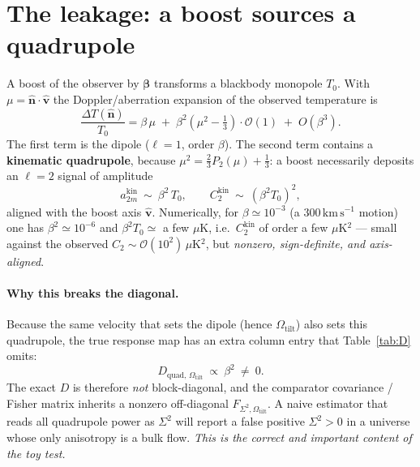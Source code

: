 \documentclass[11pt]{article}
\newcommand{\Sig}{\Sigma^2}
\newcommand{\Otilt}{\Omega_{\mathrm{tilt}}}
\newcommand{\nhat}{\hat{\mathbf n}}
\newcommand{\vhat}{\hat{\mathbf v}}
\begin{document}
\section{The leakage: a boost sources a quadrupole}
\label{sec:leak}

A boost of the observer by $\boldsymbol\beta$ transforms a blackbody monopole
$T_0$. With $\mu=\nhat\!\cdot\!\vhat$ the Doppler/aberration expansion of the
observed temperature is
\begin{equation}
  \frac{\Delta T(\nhat)}{T_0}
  = \beta\,\mu \;+\; \beta^2\!\left(\mu^2-\tfrac13\right)\cdot\mathcal{O}(1)
    \;+\; O(\beta^3).
  \label{eq:boost}
\end{equation}
The first term is the dipole ($\ell=1$, order $\beta$). The second term contains
a \textbf{kinematic quadrupole}, because $\mu^2=\tfrac23 P_2(\mu)+\tfrac13$: a
boost necessarily deposits an $\ell=2$ signal of amplitude
\begin{equation}
  a_{2m}^{\mathrm{kin}}\ \sim\ \beta^2\,T_0 ,
  \qquad
  C_2^{\mathrm{kin}}\ \sim\ (\beta^2 T_0)^2 ,
\end{equation}
aligned with the boost axis $\vhat$. Numerically, for $\beta\simeq10^{-3}$
(a $300\,\mathrm{km\,s^{-1}}$ motion) one has $\beta^2\simeq10^{-6}$ and
$\beta^2 T_0\simeq$ a few $\mu$K, i.e.\ $C_2^{\mathrm{kin}}$ of order a few
$\mu$K$^2$ --- small against the observed $C_2\sim\mathcal{O}(10^2)\,\mu$K$^2$,
but \emph{nonzero, sign-definite, and axis-aligned}.

\paragraph{Why this breaks the diagonal.} Because the same velocity that sets the
dipole (hence $\Otilt$) also sets this quadrupole, the true response map has an
extra column entry that Table~\ref{tab:D} omits:
\begin{equation}
  D_{\text{quad},\,\Otilt}\ \propto\ \beta^2\ \neq\ 0 .
  \label{eq:coupling}
\end{equation}
The exact $D$ is therefore \emph{not} block-diagonal, and the comparator
covariance / Fisher matrix inherits a nonzero off-diagonal
$F_{\Sig,\Otilt}$. A naive estimator that reads all quadrupole power as $\Sig$
will report a false positive $\Sig>0$ in a universe whose only anisotropy is a
bulk flow. \emph{This is the correct and important content of the toy test.}

\end{document}
